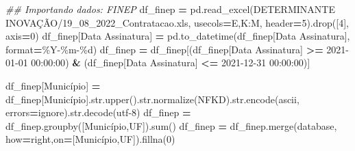 \documentclass[
  12,
  dvipsnames]{article}
\newenvironment{Shaded}{\begin{snugshade}}{\end{snugshade}}
\newcommand{\BuiltInTok}[1]{#1}
\newcommand{\CommentTok}[1]{\textcolor[rgb]{0.56,0.35,0.01}{\textit{#1}}}
\newcommand{\DecValTok}[1]{\textcolor[rgb]{0.00,0.00,0.81}{#1}}
\newcommand{\NormalTok}[1]{#1}
\newcommand{\OperatorTok}[1]{\textcolor[rgb]{0.81,0.36,0.00}{\textbf{#1}}}
\newcommand{\SpecialCharTok}[1]{\textcolor[rgb]{0.00,0.00,0.00}{#1}}
\newcommand{\StringTok}[1]{\textcolor[rgb]{0.31,0.60,0.02}{#1}}
\begin{document}
\begin{Shaded}
\begin{Highlighting}[]
\CommentTok{\#\# Importando dados: FINEP}
\NormalTok{df\_finep }\OperatorTok{=}\NormalTok{ pd.read\_excel(}\StringTok{\textquotesingle{}DETERMINANTE INOVAÇÃO/19\_08\_2022\_Contratacao.xls\textquotesingle{}}\NormalTok{, }
\NormalTok{                         usecols}\OperatorTok{=}\StringTok{\textquotesingle{}E,K:M\textquotesingle{}}\NormalTok{, header}\OperatorTok{=}\DecValTok{5}\NormalTok{).drop([}\DecValTok{4}\NormalTok{], axis}\OperatorTok{=}\DecValTok{0}\NormalTok{)}
\NormalTok{df\_finep[}\StringTok{\textquotesingle{}Data Assinatura\textquotesingle{}}\NormalTok{] }\OperatorTok{=}\NormalTok{ pd.to\_datetime(df\_finep[}\StringTok{\textquotesingle{}Data Assinatura\textquotesingle{}}\NormalTok{], }\BuiltInTok{format}\OperatorTok{=}\StringTok{\textquotesingle{}\%Y{-}\%m{-}}\SpecialCharTok{\%d}\StringTok{\textquotesingle{}}\NormalTok{)}
\NormalTok{df\_finep }\OperatorTok{=}\NormalTok{ df\_finep[(df\_finep[}\StringTok{\textquotesingle{}Data Assinatura\textquotesingle{}}\NormalTok{] }\OperatorTok{\textgreater{}=} \StringTok{\textquotesingle{}2021{-}01{-}01 00:00:00\textquotesingle{}}\NormalTok{) }
                     \OperatorTok{\&}\NormalTok{ (df\_finep[}\StringTok{\textquotesingle{}Data Assinatura\textquotesingle{}}\NormalTok{] }\OperatorTok{\textless{}=} \StringTok{\textquotesingle{}2021{-}12{-}31 00:00:00\textquotesingle{}}\NormalTok{)]}

\NormalTok{df\_finep[}\StringTok{\textquotesingle{}Município\textquotesingle{}}\NormalTok{] }\OperatorTok{=}\NormalTok{ df\_finep[}\StringTok{\textquotesingle{}Município\textquotesingle{}}\NormalTok{].}\BuiltInTok{str}\NormalTok{.upper().}\BuiltInTok{str}\NormalTok{.normalize(}\StringTok{\textquotesingle{}NFKD\textquotesingle{}}\NormalTok{).}\BuiltInTok{str}\NormalTok{.encode(}\StringTok{\textquotesingle{}ascii\textquotesingle{}}\NormalTok{, errors}\OperatorTok{=}\StringTok{\textquotesingle{}ignore\textquotesingle{}}\NormalTok{).}\BuiltInTok{str}\NormalTok{.decode(}\StringTok{\textquotesingle{}utf{-}8\textquotesingle{}}\NormalTok{)}
\NormalTok{df\_finep }\OperatorTok{=}\NormalTok{ df\_finep.groupby([}\StringTok{\textquotesingle{}Município\textquotesingle{}}\NormalTok{,}\StringTok{\textquotesingle{}UF\textquotesingle{}}\NormalTok{]).}\BuiltInTok{sum}\NormalTok{()}
\NormalTok{df\_finep }\OperatorTok{=}\NormalTok{ df\_finep.merge(database, how}\OperatorTok{=}\StringTok{\textquotesingle{}right\textquotesingle{}}\NormalTok{,on}\OperatorTok{=}\NormalTok{[}\StringTok{\textquotesingle{}Município\textquotesingle{}}\NormalTok{,}\StringTok{\textquotesingle{}UF\textquotesingle{}}\NormalTok{]).fillna(}\DecValTok{0}\NormalTok{)}


\end{Highlighting}
\end{Shaded}
\end{document}
